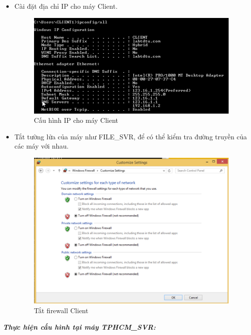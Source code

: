   \begin{itemize}
      \item Cài đặt địa chỉ IP cho máy Client.
      
      \begin{figure}[htbp]
        \centering
        \includegraphics[width=0.5\linewidth]{SiteToSiteImg/ipClient.png}
        \caption{Cấu hình IP cho máy Client}
    \end{figure}
    
      \item Tắt tường lửa của máy như FILE\_SVR, để có thể kiểm tra đường truyền của các máy với nhau.

       \begin{figure}[htbp]
        \centering
        \includegraphics[width=0.4\linewidth]{SiteToSiteImg/offFirewallClient.png}
        \caption{Tắt firewall Client}
        \end{figure}
  \end{itemize}
\newpage
  \textbf{\textit{Thực hiện cấu hình tại máy TPHCM\_SVR:}}
